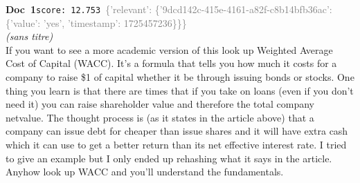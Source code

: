 \documentclass[a4paper,11pt]{article}
\begin{document}
\begin{docenv}
{\footnotesize\textcolor{doccolor}{\textbf{Doc~1}}}\hfill{\tiny\texttt{score:~12.753}}\ {\tiny\textcolor{gray}{\{'relevant': \{'9dcd142c-415e-4161-a82f-c8b14bfb36ac': \{'value': 'yes', 'timestamp': 1725457236\}\}\}}}\\[3pt]
{\small\textit{(sans titre)}}\\[2pt]
\vspace{2pt}
{\footnotesize 
If you want to see a more academic version of this look up Weighted Average Cost of Capital (WACC).   It's a formula that tells you how much it costs for a company to raise \$1 of capital whether it be through issuing bonds or stocks.   One thing you learn is that there are times that if you take on loans (even if you don't need it) you can raise shareholder value and therefore the total company netvalue. The thought process is (as it states in the article above) that a company can issue debt for cheaper than issue shares and it will have extra cash which it can use to get a better return than its net effective interest rate.   I tried to give an example but I only ended up rehashing what it says in the article. Anyhow look up WACC and you'll understand the fundamentals.}
\end{docenv}
\end{document}
